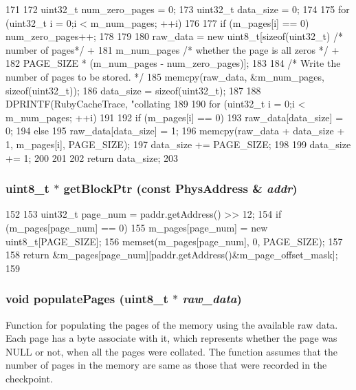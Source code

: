 \begin{DoxyCode}
171 {
172     uint32_t num_zero_pages = 0;
173     uint32_t data_size = 0;
174 
175     for (uint32_t i = 0;i < m_num_pages; ++i)
176     {
177         if (m_pages[i] == 0) num_zero_pages++;
178     }
179 
180     raw_data = new uint8_t[sizeof(uint32_t) /* number of pages*/ +
181                            m_num_pages /* whether the page is all zeros */ +
182                            PAGE_SIZE * (m_num_pages - num_zero_pages)];
183 
184     /* Write the number of pages to be stored. */
185     memcpy(raw_data, &m_num_pages, sizeof(uint32_t));
186     data_size = sizeof(uint32_t);
187 
188     DPRINTF(RubyCacheTrace, "collating %
189 
190     for (uint32_t i = 0;i < m_num_pages; ++i)
191     {
192         if (m_pages[i] == 0) {
193             raw_data[data_size] = 0;
194         } else {
195             raw_data[data_size] = 1;
196             memcpy(raw_data + data_size + 1, m_pages[i], PAGE_SIZE);
197             data_size += PAGE_SIZE;
198         }
199         data_size += 1;
200     }
201 
202     return data_size;
203 }
\end{DoxyCode}
\hypertarget{classMemoryVector_aa84e71fe0f01161f74d3430956f10390}{
\subsubsection[{getBlockPtr}]{\setlength{\rightskip}{0pt plus 5cm}uint8\_\-t $\ast$ getBlockPtr (const {\bf PhysAddress} \& {\em addr})}}
\label{classMemoryVector_aa84e71fe0f01161f74d3430956f10390}



\begin{DoxyCode}
152 {
153     uint32_t page_num = paddr.getAddress() >> 12;
154     if (m_pages[page_num] == 0) {
155         m_pages[page_num] = new uint8_t[PAGE_SIZE];
156         memset(m_pages[page_num], 0, PAGE_SIZE);
157     }
158     return &m_pages[page_num][paddr.getAddress()&m_page_offset_mask];
159 }
\end{DoxyCode}
\hypertarget{classMemoryVector_a7e181ccf8a5d687b45d21ec056af0897}{
\subsubsection[{populatePages}]{\setlength{\rightskip}{0pt plus 5cm}void populatePages (uint8\_\-t $\ast$ {\em raw\_\-data})}}
\label{classMemoryVector_a7e181ccf8a5d687b45d21ec056af0897}
Function for populating the pages of the memory using the available raw data. Each page has a byte associate with it, which represents whether the page was NULL or not, when all the pages were collated. The function assumes that the number of pages in the memory are same as those that were recorded in the checkpoint. 


